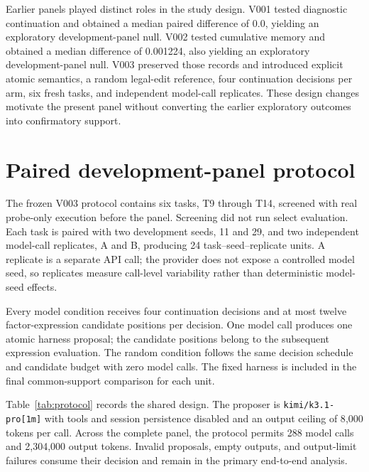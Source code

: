 Earlier panels played distinct roles in the study design. V001 tested diagnostic continuation and obtained a median paired difference of 0.0, yielding an exploratory development-panel null. V002 tested cumulative memory and obtained a median difference of 0.001224, also yielding an exploratory development-panel null. V003 preserved those records and introduced explicit atomic semantics, a random legal-edit reference, four continuation decisions per arm, six fresh tasks, and independent model-call replicates. These design changes motivate the present panel without converting the earlier exploratory outcomes into confirmatory support.

\section{Paired development-panel protocol}
\label{sec:protocol}

The frozen V003 protocol contains six tasks, T9 through T14, screened with real probe-only execution before the panel. Screening did not run select evaluation. Each task is paired with two development seeds, 11 and 29, and two independent model-call replicates, A and B, producing 24 task--seed--replicate units. A replicate is a separate API call; the provider does not expose a controlled model seed, so replicates measure call-level variability rather than deterministic model-seed effects.

Every model condition receives four continuation decisions and at most twelve factor-expression candidate positions per decision. One model call produces one atomic harness proposal; the candidate positions belong to the subsequent expression evaluation. The random condition follows the same decision schedule and candidate budget with zero model calls. The fixed harness is included in the final common-support comparison for each unit.

Table~\ref{tab:protocol} records the shared design. The proposer is \texttt{kimi/k3.1-pro[1m]} with tools and session persistence disabled and an output ceiling of 8{,}000 tokens per call. Across the complete panel, the protocol permits 288 model calls and 2{,}304{,}000 output tokens. Invalid proposals, empty outputs, and output-limit failures consume their decision and remain in the primary end-to-end analysis.

